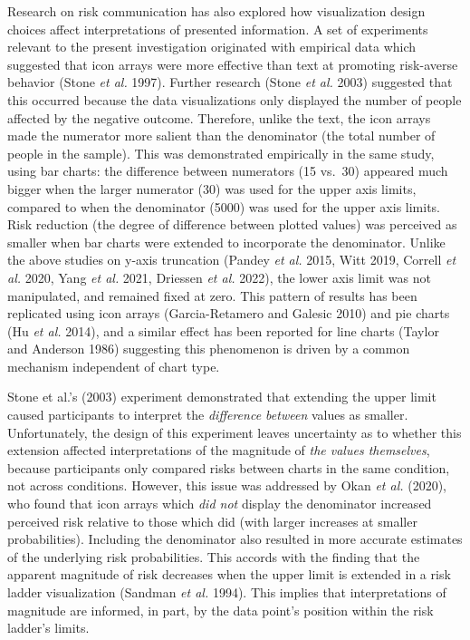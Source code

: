 \documentclass[
]{interact}
\begin{document}
Research on risk communication has also explored how visualization
design choices affect interpretations of presented information. A set of
experiments relevant to the present investigation originated with
empirical data which suggested that icon arrays were more effective than
text at promoting risk-averse behavior (Stone \emph{et al.} 1997).
Further research (Stone \emph{et al.} 2003) suggested that this occurred
because the data visualizations only displayed the number of people
affected by the negative outcome. Therefore, unlike the text, the icon
arrays made the numerator more salient than the denominator (the total
number of people in the sample). This was demonstrated empirically in
the same study, using bar charts: the difference between numerators (15
vs.~30) appeared much bigger when the larger numerator (30) was used for
the upper axis limits, compared to when the denominator (5000) was used
for the upper axis limits. Risk reduction (the degree of difference
between plotted values) was perceived as smaller when bar charts were
extended to incorporate the denominator. Unlike the above studies on
y-axis truncation (Pandey \emph{et al.} 2015, Witt 2019, Correll
\emph{et al.} 2020, Yang \emph{et al.} 2021, Driessen \emph{et al.}
2022), the lower axis limit was not manipulated, and remained fixed at
zero. This pattern of results has been replicated using icon arrays
(Garcia-Retamero and Galesic 2010) and pie charts (Hu \emph{et al.}
2014), and a similar effect has been reported for line charts (Taylor
and Anderson 1986) suggesting this phenomenon is driven by a common
mechanism independent of chart type.

Stone et al.'s (2003) experiment demonstrated that extending the upper
limit caused participants to interpret the \emph{difference between}
values as smaller. Unfortunately, the design of this experiment leaves
uncertainty as to whether this extension affected interpretations of the
magnitude of \emph{the values themselves}, because participants only
compared risks between charts in the same condition, not across
conditions. However, this issue was addressed by Okan \emph{et al.}
(2020), who found that icon arrays which \emph{did not} display the
denominator increased perceived risk relative to those which did (with
larger increases at smaller probabilities). Including the denominator
also resulted in more accurate estimates of the underlying risk
probabilities. This accords with the finding that the apparent magnitude
of risk decreases when the upper limit is extended in a risk ladder
visualization (Sandman \emph{et al.} 1994). This implies that
interpretations of magnitude are informed, in part, by the data point's
position within the risk ladder's limits.
\end{document}

